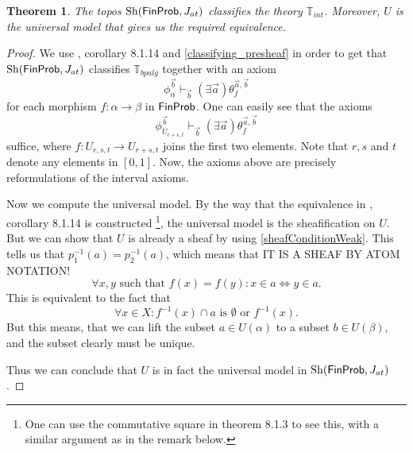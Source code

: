 \documentclass[a4paper]{amsproc}
\theoremstyle{plain}
\newtheorem{theorem}{Theorem}[section]
\theoremstyle{definition}
\theoremstyle{remark}
\numberwithin{equation}{section}
\DeclareMathOperator{\Sh}{Sh}
\newcommand{\FinProb}{\textup{\textsf{FinProb}}}
\begin{document}
\begin{theorem} \label{classifying}
The topos $\Sh(\FinProb,J_{at})$ classifies the theory $\mathbb{T}_{int}$. Moreover, $U$ is the universal model that gives us the required equivalence.
\end{theorem}
\begin{proof}
We use \cite{caramello_book}, corollary 8.1.14 and \ref{classifying_presheaf} in order to get that $\Sh(\FinProb,J_{at})$ classifies $\mathbb{T}_{bpalg}$ together with an axiom
\[
\phi_{\alpha}^{\vec{b}} \vdash_{\vec{b}} (\exists \vec{a}) \theta_f^{\vec{a},\vec{b}}
\]
for each morphism $f: \alpha \to \beta$ in $\FinProb$. One can easily see that the axioms
\[
\phi_{U_{r+s,t}}^{\vec{b}} \vdash_{\vec{b}} (\exists \vec{a}) \theta_f^{\vec{a},\vec{b}}
\]
suffice, where $f: U_{r,s,t} \to U_{r+s,t}$ joins the first two elements. Note that $r,s$ and $t$ denote any elements in $[0,1]$. Now, the axioms above are precisely reformulations of the interval axioms.

Now we compute the universal model. By the way that the equivalence in \cite{caramello_book}, corollary 8.1.14 is constructed \footnote{One can use the commutative square in theorem 8.1.3 to see this, with a similar argument as in the remark below.}, the universal model is the sheafification on $U$. But we can show that $U$ is already a sheaf by using \ref{sheafConditionWeak}. This tells us that $p_1^{-1}(a) = p_2^{-1}(a)$, which means that
IT IS A SHEAF BY ATOM NOTATION! %
\[
\forall x,y \text{ such that } f(x) = f(y): x \in a \Leftrightarrow y \in a .
\]
This is equivalent to the fact that
\[
\forall x \in X: f^{-1}(x) \cap a \text{ is } \emptyset \text{ or } f^{-1}(x) .
\]
But this means, that we can lift the subset $a \in U(\alpha)$ to a subset $b \in U(\beta)$, and the subset clearly must be unique.

Thus we can conclude that $U$ is in fact the universal model in $\Sh(\FinProb, J_{at})$.
\end{proof}
\end{document}
